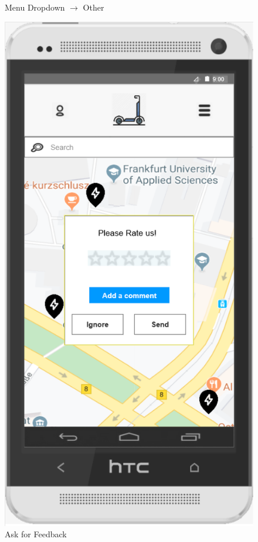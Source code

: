 \documentclass[a4paper, 12pt]{article}
\begin{document}
\begin{figure} [htbp]
\begin{center}
\begin{minipage}{0.45\textwidth}
\begin{center}
            \end{center}
            \caption{Menu Dropdown $\rightarrow$ Other}
        \end{minipage}\hfill
        \begin{minipage}{0.45\textwidth}
            \begin{center}
                \includegraphics[scale=0.65]{images/prototypes/03-ask-for-feedback.png}
            \end{center}
            \caption{Ask for Feedback}
        \end{minipage}
    \end{center}
\end{figure}
\end{document}
